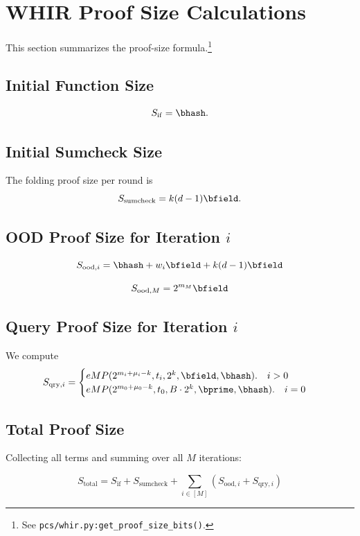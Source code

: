 \section{WHIR Proof Size Calculations}

This section summarizes the proof-size formula.\footnote{See \texttt{pcs/whir.py:get\_proof\_size\_bits()}.}

\subsection{Initial Function  Size}
\[
  S_{\mathrm{if}} = \bhash.
\]

\subsection{Initial Sumcheck Size}


The folding proof size per round is
\[
  S_{\mathrm{sumcheck}} = k(d-1)\bfield.
\]

\subsection{OOD Proof Size for Iteration \(i\)}

\[
  S_{\mathrm{ood},i}
    = \bhash+w_i\bfield+k(d-1)\bfield
\]

$$
S_{\mathrm{ood},M}=2^{m_M}\bfield
$$

\subsection{Query Proof Size for Iteration \(i\)}


We compute
\[
  S_{\mathrm{qry},i}
    =\begin{cases}  eMP(2^{m_i+\mu_i-k},t_i,2^k,\bfield,\bhash).\quad i>0\\
     eMP(2^{m_0+\mu_0-k},t_0, B\cdot 2^k,\bprime,\bhash).\quad i=0
    \end{cases}
\]


\subsection{Total Proof Size}

Collecting all terms and summing over all \(M\) iterations:

\[
\boxed{
S_{\mathrm{total}}
  = S_{\mathrm{if}}+S_{\mathrm{sumcheck}}
    + \sum_{i\in[M]}
      \left(
         S_{\mathrm{ood},i}
        + S_{\mathrm{qry},i}
      \right)
}
\]


